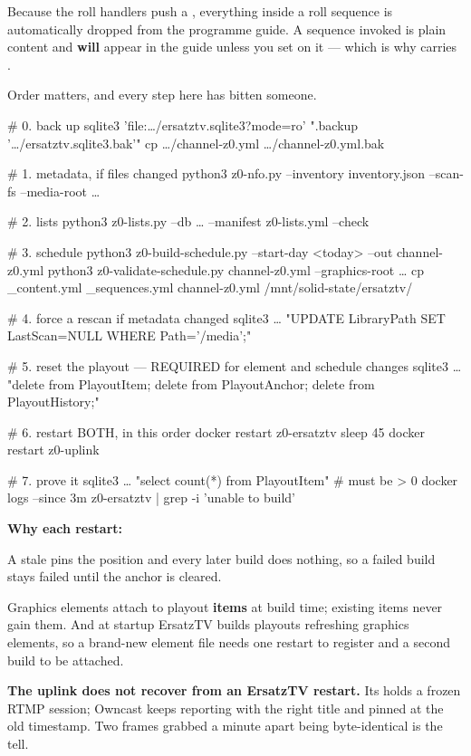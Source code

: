 \documentclass[fontpath=fonts/,logopath=logo/]{riposte-doc}
\begin{document}
Because the roll handlers push a , everything inside a roll sequence is automatically dropped from the programme guide. A sequence invoked  is plain content and \textbf{will} appear in the guide unless you set  on it — which is why  carries .



Order matters, and every step here has bitten someone.

\ripcodeopen
{}
\begin{ripcodeblock}
# 0. back up
sqlite3 'file:…/ersatztv.sqlite3?mode=ro' ".backup '…/ersatztv.sqlite3.bak'"
cp …/channel-z0.yml …/channel-z0.yml.bak

# 1. metadata, if files changed
python3 z0-nfo.py --inventory inventory.json --scan-fs --media-root …

# 2. lists
python3 z0-lists.py --db … --manifest z0-lists.yml --check

# 3. schedule
python3 z0-build-schedule.py --start-day <today> --out channel-z0.yml
python3 z0-validate-schedule.py channel-z0.yml --graphics-root …
cp _content.yml _sequences.yml channel-z0.yml /mnt/solid-state/ersatztv/

# 4. force a rescan if metadata changed
sqlite3 … "UPDATE LibraryPath SET LastScan=NULL WHERE Path='/media';"

# 5. reset the playout — REQUIRED for element and schedule changes
sqlite3 … "delete from PlayoutItem; delete from PlayoutAnchor; delete from PlayoutHistory;"

# 6. restart BOTH, in this order
docker restart z0-ersatztv
sleep 45
docker restart z0-uplink

# 7. prove it
sqlite3 … "select count(*) from PlayoutItem"          # must be > 0
docker logs --since 3m z0-ersatztv | grep -i 'unable to build'
\end{ripcodeblock}
\ripcodesizereset\ripcodeclose

\textbf{Why each restart:}

\begin{ripbullets}
\item A stale  pins the position and every later build does nothing, so a failed build stays failed until the anchor is cleared.
\item Graphics elements attach to playout \textbf{items} at build time; existing items never gain them. And at startup ErsatzTV builds playouts  refreshing graphics elements, so a brand-new element file needs one restart to register and a second build to be attached.
\item \textbf{The uplink does not recover from an ErsatzTV restart.} Its  holds a frozen RTMP session; Owncast keeps reporting  with the right title and  pinned at the old timestamp. Two frames grabbed a minute apart being byte-identical is the tell.
\end{ripbullets}
\end{document}
